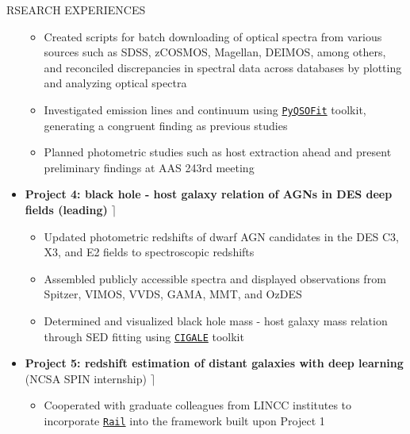 \documentclass[10pt]{article} %
\begin{document}
\begin{section}{RSEARCH EXPERIENCES}
\begin{itemize}[leftmargin=1.5em]
\begin{itemize}[leftmargin=1.5em]
        \item Created scripts for batch downloading of optical spectra from various sources such as SDSS, zCOSMOS, Magellan, DEIMOS, among others, and reconciled discrepancies in spectral data across databases by plotting and analyzing optical spectra
        \item Investigated emission lines and continuum using \href{https://github.com/legolason/PyQSOFit}{\texttt{PyQSOFit}} toolkit, generating a congruent finding as previous studies
        \item Planned photometric studies such as host extraction ahead and present preliminary findings at AAS 243rd meeting 
    \end{itemize}
    \item \textbf{Project 4: black hole - host galaxy relation of AGNs in DES deep fields (leading)} \hfill $\rceil$ %
    \begin{itemize}[leftmargin=1.5em]
        \item Updated photometric redshifts of dwarf AGN candidates in the DES C3, X3, and E2 fields to spectroscopic redshifts
        \item Assembled publicly accessible spectra and displayed observations from Spitzer, VIMOS, VVDS, GAMA, MMT, and OzDES
        \item Determined and visualized black hole mass - host galaxy mass relation through SED fitting using \href{https://cigale.lam.fr/}{\texttt{CIGALE}} toolkit
    \end{itemize}
    \item \textbf{Project 5: redshift estimation of distant galaxies with deep learning} (NCSA SPIN internship) \hfill $\rceil$ %
    \begin{itemize}[leftmargin=1.5em]
        \item Cooperated with graduate colleagues from LINCC institutes to incorporate \href{https://github.com/LSSTDESC/RAIL}{\texttt{Rail}} into the framework built upon Project 1
    \end{itemize}
\end{itemize}


\end{section}
\end{document}
